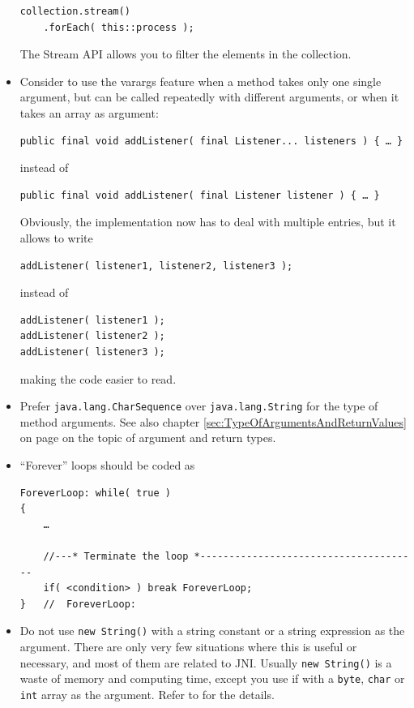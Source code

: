 \documentclass[11pt,a4paper, titlepage, parskip=half, headsepline, footsepline, cleardoublepage=current, headheight=1cm]{scrbook}
\newcommand*{\tqvref}[1]{\hyperref[{#1}]{\ref*{#1}} on page \pageref{#1}}
\begin{document}
\begin{itemize}
{\begin{lstlisting}
collection.stream()
    .forEach( this::process );
\end{lstlisting}

The Stream API allows you to filter the elements in the collection.}

\item{Consider to use the varargs feature when a method takes only one single argument, but can be called repeatedly with different arguments, or when it takes an array as argument:

\begin{lstlisting}
public final void addListener( final Listener... listeners ) { … }
\end{lstlisting}

instead of
\begin{lstlisting}
public final void addListener( final Listener listener ) { … }
\end{lstlisting}

Obviously, the implementation now has to deal with multiple entries, but it allows to write
\begin{lstlisting}
addListener( listener1, listener2, listener3 );
\end{lstlisting}
instead of
\begin{lstlisting}
addListener( listener1 );
addListener( listener2 );
addListener( listener3 );
\end{lstlisting}
making the code easier to read.}

\item{Prefer \lstinline|java.lang.CharSequence|\autocite{ORACLE_DOC_CHARSEQUENCE_INTERFACE} over \lstinline|java.lang.String| for the type of method arguments. See also chapter \tqvref{sec:TypeOfArgumentsAndReturnValues} on the topic of argument and return types.}

\item{“Forever” loops should be coded as
\begin{lstlisting}
ForeverLoop: while( true ) 
{ 
    … 
    
    //---* Terminate the loop *--------------------------------------
    if( <condition> ) break ForeverLoop;
}   //  ForeverLoop:
\end{lstlisting} }

\item{Do not use \lstinline|new String()| with a string constant or a string expression as the argument. There are only very few situations where this is useful or necessary, and most of them are related to JNI. Usually \lstinline|new String()| is a waste of memory and computing time, except you use if with a \lstinline|byte|, \lstinline|char| or \lstinline|int| array as the argument. Refer to \autocite{ORACLE_DOC_STRING_CLASS} for the details.}


\end{itemize}
\end{document}
